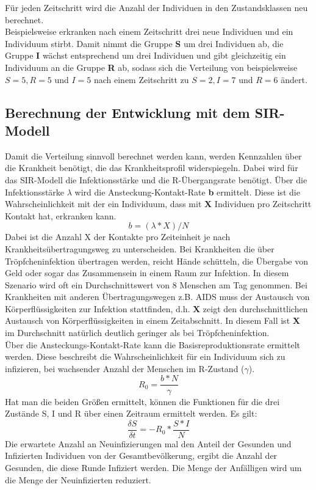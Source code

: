 Für jeden Zeitschritt wird die Anzahl der Individuen in den Zustandsklassen neu berechnet.\\
Beispielsweise erkranken nach einem Zeitschritt drei neue Individuen und ein Individuum stirbt. Damit nimmt die Gruppe  \textbf{S} um drei Individuen ab, die Gruppe \textbf{I} wächst entsprechend um drei Individuen und gibt gleichzeitig ein Individuum an die Gruppe \textbf{R} ab, sodass sich die Verteilung von beispielsweise $ S = 5, R = 5 $ und $ I = 5 $ nach einem Zeitschritt zu $ S = 2, I = 7 $ und $ R = 6 $ ändert.

\subsection*{Berechnung der Entwicklung mit dem SIR-Modell}
Damit die Verteilung sinnvoll berechnet werden kann, werden Kennzahlen über die Krankheit benötigt, die das Krankheitsprofil widerspiegeln. Dabei wird für das SIR-Modell die Infektionsstärke und die \glqq R\grqq-Übergangsrate benötigt.
Über die Infektionsstärke $\lambda$ wird die Ansteckung-Kontakt-Rate \textbf{b} ermittelt. Diese ist die Wahrscheinlichkeit mit der ein Individuum, dass mit \textbf{X} Individuen pro Zeitschritt Kontakt hat, erkranken kann.
\begin{equation}
b = ( \lambda * X ) / N
\end{equation}
Dabei ist die Anzahl X der Kontakte pro Zeiteinheit je nach Krankheitsübertragungsweg zu unterscheiden. Bei Krankheiten die über Tröpfcheninfektion übertragen werden, reicht Hände schütteln, die Übergabe von Geld oder sogar das Zusammensein in einem Raum zur Infektion. In diesem Szenario wird oft ein Durchschnittswert von 8 Menschen am Tag genommen.%
Bei Krankheiten mit anderen Übertragungswegen z.B. AIDS muss der Austausch von Körperflüssigkeiten zur Infektion stattfinden, d.h. \textbf{X} zeigt den durchschnittlichen Austausch von Körperflüssigkeiten in einem Zeitabschnitt. In diesem Fall ist \textbf{X} im Durchschnitt natürlich deutlich geringer als bei Tröpfcheninfektion.\\
Über die Ansteckungs-Kontakt-Rate kann die Basisreproduktionsrate ermittelt werden. Diese beschreibt die Wahrscheinlichkeit für ein Individuum sich zu infizieren, bei wachsender Anzahl der Menschen im \glqq R\grqq-Zustand ($\gamma$).
\begin{equation}
R_0 = \frac{ b * N }{ \gamma }
\end{equation}
Hat man die beiden Größen ermittelt, können die Funktionen für die drei Zustände S, I und R über einen Zeitraum ermittelt werden. 
Es gilt:
\begin{equation}
\frac{ \delta S }{ \delta t } = -R_0 * \frac{S * I}{N}
\end{equation}
Die erwartete Anzahl an Neuinfizierungen mal den Anteil der Gesunden und Infizierten Individuen von der Gesamtbevölkerung, ergibt die Anzahl der Gesunden, die diese Runde Infiziert werden. Die Menge der Anfälligen wird um die Menge der Neuinfizierten reduziert.

